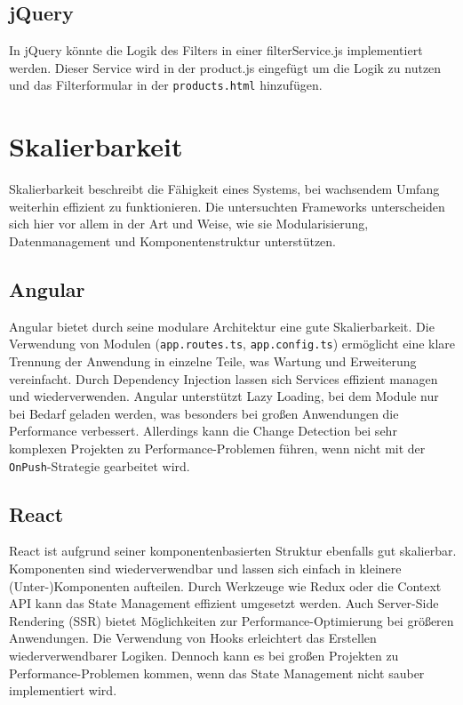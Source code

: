 \documentclass[oneside]{ausarbeitung}
\begin{document}
\subsection{jQuery}

In jQuery könnte die Logik des Filters in einer filterService.js implementiert werden. 
Dieser Service wird in der product.js eingefügt um die Logik zu nutzen und das Filterformular in der \texttt{products.html} hinzufügen. 

\section{Skalierbarkeit}

Skalierbarkeit beschreibt die Fähigkeit eines Systems, bei wachsendem Umfang weiterhin effizient zu funktionieren. Die untersuchten Frameworks unterscheiden sich hier vor allem in der Art und Weise, wie sie Modularisierung, Datenmanagement und Komponentenstruktur unterstützen.

\subsection{Angular}

Angular bietet durch seine modulare Architektur eine gute Skalierbarkeit. Die Verwendung von Modulen (\texttt{app.routes.ts}, \texttt{app.config.ts}) ermöglicht eine klare Trennung der Anwendung in einzelne Teile, was Wartung und Erweiterung vereinfacht. Durch Dependency Injection lassen sich Services effizient managen und wiederverwenden. Angular unterstützt Lazy Loading, bei dem Module nur bei Bedarf geladen werden, was besonders bei großen Anwendungen die Performance verbessert. Allerdings kann die Change Detection bei sehr komplexen Projekten zu Performance-Problemen führen, wenn nicht mit der \texttt{OnPush}-Strategie gearbeitet wird.

\subsection{React}

React ist aufgrund seiner komponentenbasierten Struktur ebenfalls gut skalierbar. Komponenten sind wiederverwendbar und lassen sich einfach in kleinere (Unter-)Komponenten aufteilen. Durch Werkzeuge wie Redux oder die Context API kann das State Management effizient umgesetzt werden. Auch Server-Side Rendering (SSR) bietet Möglichkeiten zur Performance-Optimierung bei größeren Anwendungen. Die Verwendung von Hooks erleichtert das Erstellen wiederverwendbarer Logiken. Dennoch kann es bei großen Projekten zu Performance-Problemen kommen, wenn das State Management nicht sauber implementiert wird.
\end{document}
